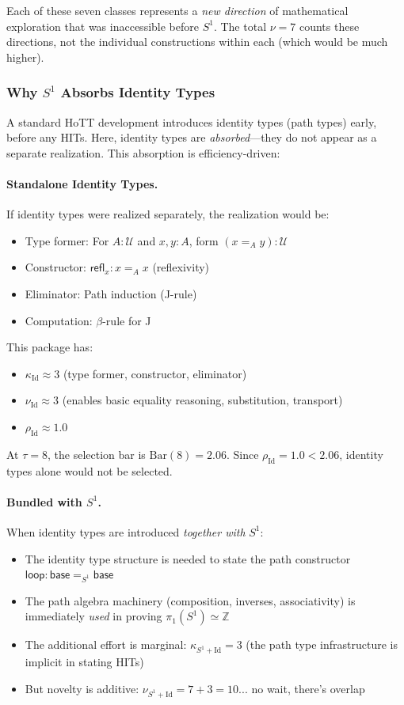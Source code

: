 \documentclass[11pt]{article}
\theoremstyle{definition}
\begin{document}
Each of these seven classes represents a \emph{new direction} of mathematical exploration that was inaccessible before $S^1$. The total $\nu=7$ counts these directions, not the individual constructions within each (which would be much higher).

\subsubsection{Why $S^1$ Absorbs Identity Types}

A standard HoTT development introduces identity types (path types) early, before any HITs. Here, identity types are \emph{absorbed}—they do not appear as a separate realization. This absorption is efficiency-driven:

\paragraph{Standalone Identity Types.}
If identity types were realized separately, the realization would be:
\begin{itemize}
\item Type former: For $A : \mathcal{U}$ and $x, y : A$, form $(x =_A y) : \mathcal{U}$
\item Constructor: $\mathsf{refl}_x : x =_A x$ (reflexivity)
\item Eliminator: Path induction (J-rule)
\item Computation: $\beta$-rule for J
\end{itemize}

This package has:
\begin{itemize}
\item $\kappa_{\text{Id}} \approx 3$ (type former, constructor, eliminator)
\item $\nu_{\text{Id}} \approx 3$ (enables basic equality reasoning, substitution, transport)
\item $\rho_{\text{Id}} \approx 1.0$
\end{itemize}

At $\tau=8$, the selection bar is $\text{Bar}(8) = 2.06$. Since $\rho_{\text{Id}} = 1.0 < 2.06$, identity types alone would not be selected.

\paragraph{Bundled with $S^1$.}
When identity types are introduced \emph{together with} $S^1$:
\begin{itemize}
\item The identity type structure is needed to state the path constructor $\mathsf{loop} : \mathsf{base} =_{S^1} \mathsf{base}$
\item The path algebra machinery (composition, inverses, associativity) is immediately \emph{used} in proving $\pi_1(S^1) \simeq \mathbb{Z}$
\item The additional effort is marginal: $\kappa_{S^1 + \text{Id}} = 3$ (the path type infrastructure is implicit in stating HITs)
\item But novelty is additive: $\nu_{S^1 + \text{Id}} = 7 + 3 = 10$... no wait, there's overlap
\end{itemize}
\end{document}
